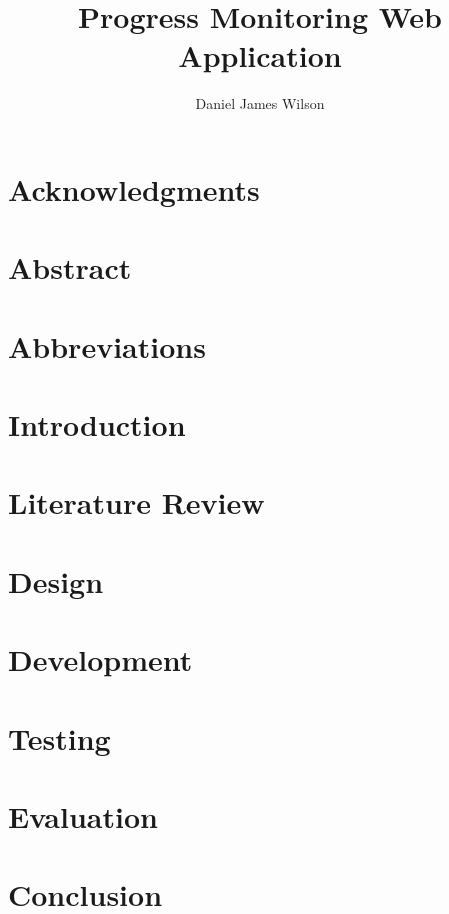 \documentclass[titlepage,a4paper,11pt,oneside]{book} %
\author{Daniel James Wilson}
\title{Progress Monitoring Web Application}
\begin{document}
\frontmatter %
\maketitle

\begin{center}
\chapter{Acknowledgments}


\chapter{Abstract}

\end{center}

\tableofcontents
\listoffigures
\listoftables

\chapter{Abbreviations}

\mainmatter %
\chapter{Introduction}
\label{sec:mainIntro}


\chapter{Literature Review}
\label{sec:litRev}


\chapter{Design}
\label{sec:design}


\chapter{Development}
\label{sec:dev}


\chapter{Testing}
\label{sec:test}


\chapter{Evaluation}
\label{sec:eval}


\chapter{Conclusion}
\label{sec:conc}


\pagebreak

\end{document}
